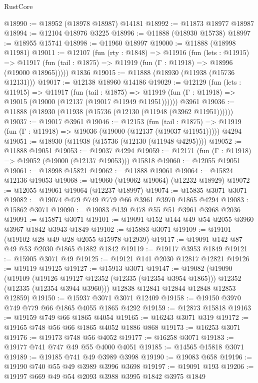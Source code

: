 \begin{lexlean}{RustCore}
\begin{coremodule}
@18990 := @18952 (@18978 @18987) @14181
@18992 := @11873 @18977 @18987
@18994 := @12104 @18976 @3225
@18996 := @11888 (@18930 @15738)
@18997 := @18955 @15741
@18998 := @11960 @18997
@19000 := @11888 (@18998 @11981)
@19011 := @12107
    (fun (rty : @1848) =>
    @11916
      (fun (lets : @11915) =>
      @11917 (fun (tail : @1875) => @11919 (fun (Γ : @11918) => @18996 (@19000 @18965)))))
    @1836
@19015 := @11888 (@18930 (@11938 (@15736 @12131)))
@19017 := @12138 @18960 @14186
@19029 := @12129
    (fun (lets : @11915) =>
    @11917
      (fun (tail : @1875) =>
      @11919 (fun (Γ : @11918) => @19015 (@19000 (@12137 (@19017 @11949 @11951))))))
    @3961
@19036 := @11888 (@18930 (@11938 (@15736 (@12130 (@11948 (@3962 @11951))))))
@19037 := @19017 @3961
@19046 := @12153
    (fun (tail : @1875) => @11919 (fun (Γ : @11918) => @19036 (@19000 (@12137 (@19037 @11951)))))
    @4294
@19051 := @18930 (@11938 (@15736 (@12130 (@11948 @4295))))
@19052 := @11888 @19051
@19053 := @19037 @4294
@19059 := @12171 (fun (Γ : @11918) => @19052 (@19000 (@12137 @19053))) @15818
@19060 := @12055 @19051
@19061 := @18998 @15821
@19062 := @11888 @19061
@19064 := @15824 @12136 @19053
@19068 := @19060 (@19062 @19064) (@12232 @18929)
@19072 := @12055 @19061 @19064 (@12237 @18997)
@19074 := @15835 @3071 @3071
@19082 := @19074 @479 @749 @779 @66 @3961 @3970 @1865 @4294
@19083 := @15862 @3071
@19090 := @19083 @139 @478 @55 @51 @3961 @3968 @2036
@19091 := @15871 @3071
@19101 := @19091 @152 @144 @49 @54 @2055 @3960 @3967 @1842 @3943 @1849
@19102 := @15883 @3071
@19109 := @19101 (@19102 @28 @49 @28 @2055 @15978 @12939)
@19117 := @19091 @142 @87 @49 @53 @2030 @1865 @1882 @1842
@19119 := @19117 @3953 @1849
@19121 := @15905 @3071 @49
@19125 := @19121 @141 @2030 @12817 @12821
@19126 := @19119 @19125
@19127 := @15913 @3071
@19147 := @19082
    (@19090
      (@19109
        (@19126 @19127 @12352 (@12335 (@12354 @3954 @1865)))
        @12352
        (@12335 (@12354 @3944 @3960)))
      @12838
      @12841
      @12844
      @12848
      @12853
      @12859)
@19150 := @15937 @3071 @3071 @12409
@19158 := @19150 @3970 @749 @779 @66 @1865 @4055 @1865 @4292
@19159 := @12873 @15818
@19163 := @19159 @749 @66 @1865 @4054
@19165 := @16243 @3071 @319
@19172 := @19165 @748 @56 @66 @1865 @4052 @1886 @868
@19173 := @16253 @3071
@19176 := @19173 @748 @56 @4052
@19177 := @16258 @3071
@19183 := @19177 @741 @747 @49 @55 @4000 @4051
@19185 := @14565 @15818 @3071
@19189 := @19185 @741 @49 @3989 @3998
@19190 := @19083 @658
@19196 := @19190 @740 @55 @49 @3989 @3996 @3698
@19197 := @19091 @193
@19206 := @19197 @669 @49 @54 @2093 @3988 @3995 @1842 @3975 @1849

\end{coremodule}
\end{lexlean}
